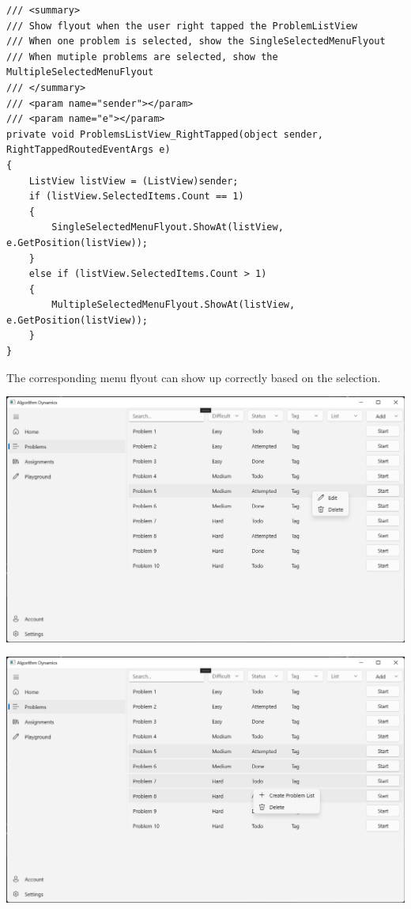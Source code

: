 \documentclass[a4paper]{report}
\begin{document}
\begin{verbatim}
/// <summary>
/// Show flyout when the user right tapped the ProblemListView
/// When one problem is selected, show the SingleSelectedMenuFlyout
/// When mutiple problems are selected, show the MultipleSelectedMenuFlyout
/// </summary>
/// <param name="sender"></param>
/// <param name="e"></param>
private void ProblemsListView_RightTapped(object sender, RightTappedRoutedEventArgs e)
{
    ListView listView = (ListView)sender;
    if (listView.SelectedItems.Count == 1)
    {
        SingleSelectedMenuFlyout.ShowAt(listView, e.GetPosition(listView));
    }
    else if (listView.SelectedItems.Count > 1)
    {
        MultipleSelectedMenuFlyout.ShowAt(listView, e.GetPosition(listView));
    }
}
\end{verbatim}

The corresponding menu flyout can show up correctly based on the selection.

\includegraphics[width=\textwidth, height=\textheight, keepaspectratio]{ProblemsPage-SingleSelected-Flyout}

\includegraphics[width=\textwidth, height=\textheight, keepaspectratio]{ProblemsPage-MultipleSelected-Flyout}
\end{document}
